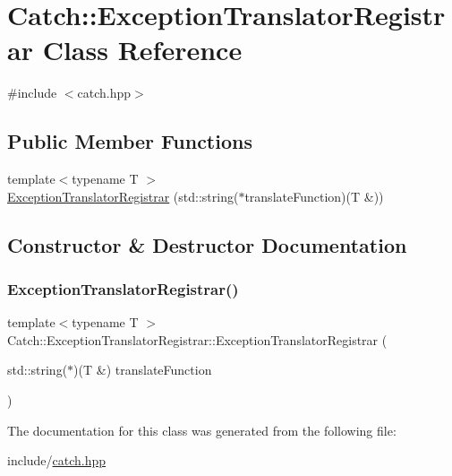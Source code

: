 \hypertarget{classCatch_1_1ExceptionTranslatorRegistrar}{}\section{Catch\+:\+:Exception\+Translator\+Registrar Class Reference}
\label{classCatch_1_1ExceptionTranslatorRegistrar}


{\ttfamily \#include $<$catch.\+hpp$>$}

\subsection*{Public Member Functions}
\begin{DoxyCompactItemize}
\item 
{\footnotesize template$<$typename T $>$ }\\\mbox{\hyperlink{classCatch_1_1ExceptionTranslatorRegistrar_aa73229de911f26b1df6c6c87c4d9e04e}{Exception\+Translator\+Registrar}} (std\+::string($\ast$translate\+Function)(T \&))
\end{DoxyCompactItemize}


\subsection{Constructor \& Destructor Documentation}
\mbox{\label{classCatch_1_1ExceptionTranslatorRegistrar_aa73229de911f26b1df6c6c87c4d9e04e}} 
\subsubsection{\texorpdfstring{Exception\+Translator\+Registrar()}{ExceptionTranslatorRegistrar()}}
{\footnotesize\ttfamily template$<$typename T $>$ \\
Catch\+::\+Exception\+Translator\+Registrar\+::\+Exception\+Translator\+Registrar (\begin{DoxyParamCaption}\item[{std\+::string($\ast$)(T \&)}]{translate\+Function }\end{DoxyParamCaption})\hspace{0.3cm}{\ttfamily [inline]}}



The documentation for this class was generated from the following file\+:\begin{DoxyCompactItemize}
\item 
include/\mbox{\hyperlink{catch_8hpp}{catch.\+hpp}}\end{DoxyCompactItemize}
